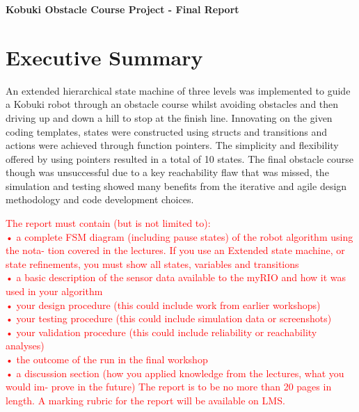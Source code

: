 \documentclass[11pt]{article}
\begin{document}

\clearpage


\begin{center}
\textbf{\Large{Kobuki Obstacle Course Project - Final Report}}
\end{center}

\vspace{-0.5cm}
\section*{Executive Summary}
\vspace{-0.2cm} An extended hierarchical state machine of three levels was implemented to guide a Kobuki robot through an obstacle course whilst avoiding obstacles and then driving up and down a hill to stop at the finish line. Innovating on the given coding templates, states were constructed using structs and transitions and actions were achieved through function pointers. The simplicity and flexibility offered by using pointers resulted in a total of 10 states. The final obstacle course though was unsuccessful due to a key reachability flaw that was missed, the simulation and testing showed many benefits from the iterative and agile design methodology and code development choices.

\setcounter{tocdepth}{2}
\tableofcontents
\thispagestyle{empty}

\clearpage
\setcounter{page}{1}








\textcolor{red}{The report must contain (but is not limited to):\\
• a complete FSM diagram (including pause states) of the robot algorithm using the nota- tion covered in the lectures. If you use an Extended state machine, or state refinements, you must show all states, variables and transitions\\
• a basic description of the sensor data available to the myRIO and how it was used in your algorithm\\
• your design procedure (this could include work from earlier workshops)\\
• your testing procedure (this could include simulation data or screenshots)\\
• your validation procedure (this could include reliability or reachability analyses)\\
• the outcome of the run in the final workshop\\
• a discussion section (how you applied knowledge from the lectures, what you would im- prove in the future)
The report is to be no more than 20 pages in length. A marking rubric for the report will be available on LMS.
}

\clearpage



\clearpage
{}
\renewcommand*{\thepage}{x.\roman{page}}
\appendix

\end{document}
